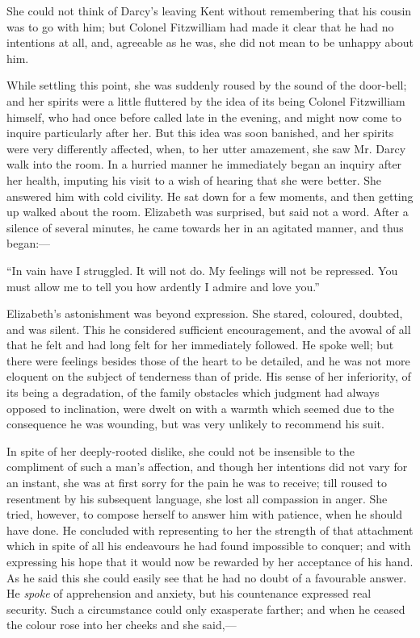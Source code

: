 \documentclass[12pt]{book}
\begin{document}
She could not think of Darcy's leaving Kent without remembering that his cousin was to go with him; but Colonel Fitzwilliam had made it clear that he had no intentions at all, and, agreeable as he was, she did not mean to be unhappy about him.

While settling this point, she was suddenly roused by the sound of the door-bell; and her spirits were a little fluttered by the idea of its being Colonel Fitzwilliam himself, who had once before called late in the evening, and might now come to inquire particularly after her. But this idea was soon banished, and her spirits were very differently affected, when, to her utter amazement, she saw Mr. Darcy walk into the room. In a hurried manner he immediately began an inquiry after her health, imputing his visit to a wish of hearing that she were better. She answered him with cold civility. He sat down for a few moments, and then getting up walked about the room. Elizabeth was surprised, but said not a word. After a silence of several minutes, he came towards her in an agitated manner, and thus began:---

``In vain have I struggled. It will not do. My feelings will not be repressed. You must allow me to tell you how ardently I admire and love you.''

Elizabeth's astonishment was beyond expression. She stared, coloured, doubted, and was silent. This he considered sufficient encouragement, and the avowal of all that he felt and had long felt for her immediately followed. He spoke well; but there were feelings besides those of the heart to be detailed, and he was not more eloquent on the subject of tenderness than of pride. His sense of her inferiority, of its being a degradation, of the family obstacles which judgment had always opposed to inclination, were dwelt on with a warmth which seemed due to the consequence he was wounding, but was very unlikely to recommend his suit.

In spite of her deeply-rooted dislike, she could not be insensible to the compliment of such a man's affection, and though her intentions did not vary for an instant, she was at first sorry for the pain he was to receive; till roused to resentment by his subsequent language, she lost all compassion in anger. She tried, however, to compose herself to answer him with patience, when he should have done. He concluded with representing to her the strength of that attachment which in spite of all his endeavours he had found impossible to conquer; and with expressing his hope that it would now be rewarded by her acceptance of his hand. As he said this she could easily see that he had no doubt of a favourable answer. He \textit{spoke} of apprehension and anxiety, but his countenance expressed real security. Such a circumstance could only exasperate farther; and when he ceased the colour rose into her cheeks and she said,---
\end{document}
